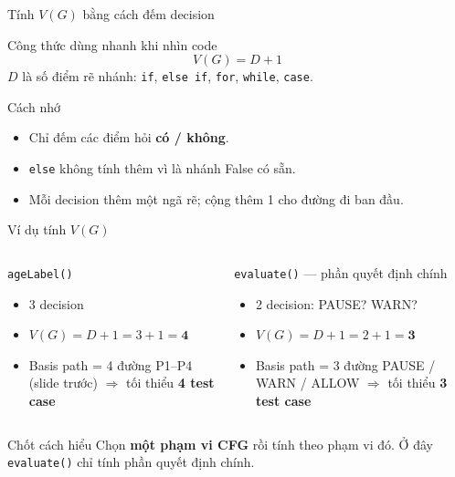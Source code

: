 \documentclass[aspectratio=169,12pt]{beamer}
\begin{document}
\begin{frame}{Tính $V(G)$ bằng cách đếm decision}
  \begin{block}{Công thức dùng nhanh khi nhìn code}
    \large
    \[
      V(G) = D + 1
    \]
    \small
    $D$ là số điểm rẽ nhánh: \texttt{if}, \texttt{else if},
    \texttt{for}, \texttt{while}, \texttt{case}.
  \end{block}

  \vspace{0.4em}
  \begin{alertblock}{Cách nhớ}
    \begin{itemize}
      \item Chỉ đếm các điểm hỏi \textbf{có / không}.
      \item \texttt{else} không tính thêm vì là nhánh False có sẵn.
      \item Mỗi decision thêm một ngã rẽ; cộng thêm 1 cho đường đi ban đầu.
    \end{itemize}
  \end{alertblock}
\end{frame}

\begin{frame}[shrink=8]{Ví dụ tính $V(G)$}
  \begin{columns}[T]
    \begin{block}{\texttt{ageLabel()}}
      \begin{itemize}
        \item 3 decision
        \item $V(G) = D + 1 = 3 + 1 = \mathbf{4}$
        \item Basis path = 4 đường P1--P4 (slide trước)
          $\Rightarrow$ tối thiểu \textbf{4 test case}
      \end{itemize}
    \end{block}

    \begin{block}{\texttt{evaluate()} --- phần quyết định chính}
      \begin{itemize}
        \item 2 decision: PAUSE? WARN?
        \item $V(G) = D + 1 = 2 + 1 = \mathbf{3}$
        \item Basis path = 3 đường PAUSE / WARN / ALLOW
          $\Rightarrow$ tối thiểu \textbf{3 test case}
      \end{itemize}
    \end{block}
  \end{columns}

  \vspace{0.5em}
  \begin{alertblock}{Chốt cách hiểu}
    Chọn \textbf{một phạm vi CFG} rồi tính theo phạm vi đó.
    Ở đây \texttt{evaluate()} chỉ tính phần quyết định chính.
  \end{alertblock}
\end{frame}
\end{document}
